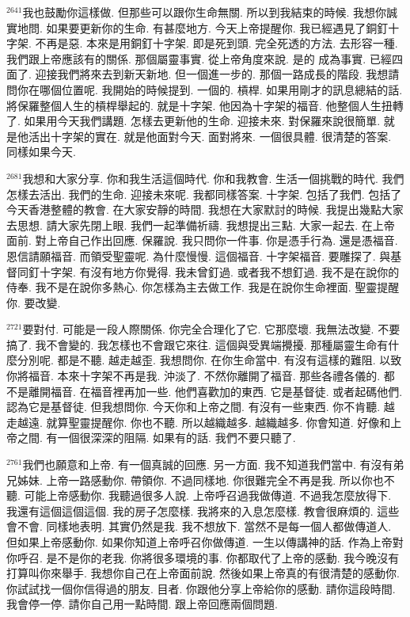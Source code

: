\documentclass{book}
\begin{document}
$^{2641}$我也鼓勵你這樣做.
但那些可以跟你生命無關.
所以到我結束的時候.
我想你誠實地問.
如果要更新你的生命.
有甚麼地方.
今天上帝提醒你.
我已經遇見了銅釘十字架.
不再是惡.
本來是用銅釘十字架.
即是死到頭.
完全死透的方法.
去形容一種.
我們跟上帝應該有的關係.
那個屬靈事實.
從上帝角度來說.
是的 成為事實.
已經四面了.
迎接我們將來去到新天新地.
但一個進一步的.
那個一路成長的階段.
我想請問你在哪個位置呢.
我開始的時候提到.
一個的.
槓桿.
如果用剛才的訊息總結的話.
將保羅整個人生的槓桿舉起的.
就是十字架.
他因為十字架的福音.
他整個人生扭轉了.
如果用今天我們講題.
怎樣去更新他的生命.
迎接未來.
對保羅來說很簡單.
就是他活出十字架的實在.
就是他面對今天.
面對將來.
一個很具體.
很清楚的答案.
同樣如果今天.

$^{2681}$我想和大家分享.
你和我生活這個時代.
你和我教會.
生活一個挑戰的時代.
我們怎樣去活出.
我們的生命.
迎接未來呢.
我都同樣答案.
十字架.
包括了我們.
包括了今天香港整體的教會.
在大家安靜的時間.
我想在大家默討的時候.
我提出幾點大家去思想.
請大家先閉上眼.
我們一起準備祈禱.
我想提出三點.
大家一起去.
在上帝面前.
對上帝自己作出回應.
保羅說.
我只問你一件事.
你是憑手行為.
還是憑福音.
恩信請願福音.
而領受聖靈呢.
為什麼慢慢.
這個福音.
十字架福音.
要雕探了.
與基督同釘十字架.
有沒有地方你覺得.
我未曾釘過.
或者我不想釘過.
我不是在說你的侍奉.
我不是在說你多熱心.
你怎樣為主去做工作.
我是在說你生命裡面.
聖靈提醒你.
要改變.

$^{2721}$要對付.
可能是一段人際關係.
你完全合理化了它.
它那麼壞.
我無法改變.
不要搞了.
我不會變的.
我怎樣也不會跟它來往.
這個與受異端攪擾.
那種屬靈生命有什麼分別呢.
都是不聽.
越走越歪.
我想問你.
在你生命當中.
有沒有這樣的難阻.
以致你將福音.
本來十字架不再是我.
沖淡了.
不然你離開了福音.
那些各禮各儀的.
都不是離開福音.
在福音裡再加一些.
他們喜歡加的東西.
它是基督徒.
或者起碼他們.
認為它是基督徒.
但我想問你.
今天你和上帝之間.
有沒有一些東西.
你不肯聽.
越走越遠.
就算聖靈提醒你.
你也不聽.
所以越織越多.
越織越多.
你會知道.
好像和上帝之間.
有一個很深深的阻隔.
如果有的話.
我們不要只聽了.

$^{2761}$我們也願意和上帝.
有一個真誠的回應.
另一方面.
我不知道我們當中.
有沒有弟兄姊妹.
上帝一路感動你.
帶領你.
不過同樣地.
你很難完全不再是我.
所以你也不聽.
可能上帝感動你.
我聽過很多人說.
上帝呼召過我做傳道.
不過我怎麼放得下.
我還有這個這個這個.
我的房子怎麼樣.
我將來的入息怎麼樣.
教會很麻煩的.
這些會不會.
同樣地表明.
其實仍然是我.
我不想放下.
當然不是每一個人都做傳道人.
但如果上帝感動你.
如果你知道上帝呼召你做傳道.
一生以傳講神的話.
作為上帝對你呼召.
是不是你的老我.
你將很多環境的事.
你都取代了上帝的感動.
我今晚沒有打算叫你來舉手.
我想你自己在上帝面前說.
然後如果上帝真的有很清楚的感動你.
你試試找一個你信得過的朋友.
目者.
你跟他分享上帝給你的感動.
請你這段時間.
我會停一停.
請你自己用一點時間.
跟上帝回應兩個問題.
\end{document}
